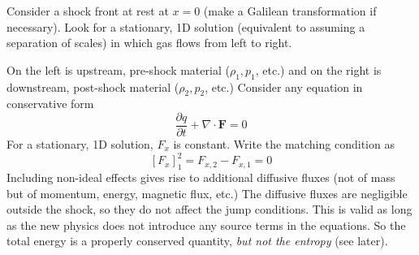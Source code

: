 \documentclass{jknotes}
\newcommand{\dif}[1]{\left[#1\right]_1^2}
\begin{document}
Consider a shock front at rest at $x=0$ (make a Galilean transformation if
necessary). Look for a stationary, 1D solution (equivalent to assuming a
separation of scales) in which gas flows from left to right.

\begin{center}
\end{center}

On the left is upstream, pre-shock material ($\rho_1, p_1$, etc.) and on the
right is downstream, post-shock material ($\rho_2, p_2$, etc.) Consider any
equation in conservative form
\begin{equation}
	\frac{\partial q}{\partial t} + \nabla \cdot \symbf{F} = 0
\end{equation}
For a stationary, 1D solution, $F_x$ is constant. Write the matching condition
as
\begin{equation}
	\dif{F_x} = F_{x,2} - F_{x,1} = 0
\end{equation}
Including non-ideal effects gives rise to additional diffusive fluxes (not of
mass but of momentum, energy, magnetic flux, etc.) The diffusive fluxes are
negligible outside the shock, so they do not affect the jump conditions. This
is valid as long as the new physics does not introduce any source terms in the
equations. So the total energy is a properly conserved quantity, \emph{but not
the entropy} (see later). 
\end{document}
